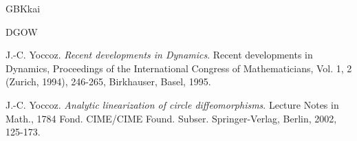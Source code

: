 \documentclass{amsart}
\theoremstyle{definition}
\begin{document}
\begin{CJK*}{GBK}{kai}
\begin{thebibliography}{DGOW}
			
	 J.-C. Yoccoz. {\it
				 Recent developments in Dynamics}.
			Recent developments in Dynamics, Proceedings of the International
 Congress of Mathematicians, Vol. 1, 2 (Zurich, 1994), 246-265, Birkhauser, Basel,
 1995.

			
			
			 J.-C. Yoccoz. {\it
				Analytic linearization of circle diffeomorphisms}.
			Lecture Notes in Math., 1784
			Fond. CIME/CIME Found. Subser.
			Springer-Verlag, Berlin, 2002, 125-173.
			
			
			
			
			
			
			
		\end{thebibliography}
		
		
		
		
		
	\end{CJK*}
	
	
\end{document}
